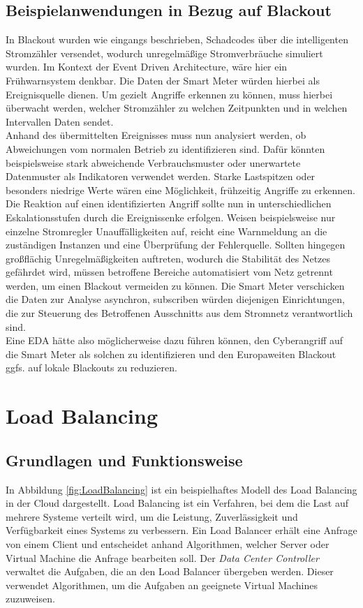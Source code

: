 \documentclass[a4paper,12pt]{article}
\let\stdsection\section
\renewcommand\section{\newpage\stdsection}
\begin{document}
\subsection{Beispielanwendungen in Bezug auf Blackout}
In Blackout wurden wie eingangs beschrieben, Schadcodes über die intelligenten Stromzähler versendet, wodurch unregelmäßige Stromverbräuche simuliert wurden. Im Kontext der Event Driven Architecture, wäre hier ein Frühwarnsystem denkbar. Die Daten der Smart Meter würden hierbei als Ereignisquelle dienen. Um gezielt Angriffe erkennen zu können, muss hierbei überwacht werden, welcher Stromzähler zu welchen Zeitpunkten und in welchen Intervallen Daten sendet.\\
Anhand des übermittelten Ereignisses muss nun analysiert werden, ob Abweichungen vom normalen Betrieb zu identifizieren sind. Dafür könnten beispielsweise stark abweichende Verbrauchsmuster oder unerwartete Datenmuster als Indikatoren verwendet werden. Starke Lastspitzen oder besonders niedrige Werte wären eine Möglichkeit, frühzeitig Angriffe zu erkennen.\\
Die Reaktion auf einen identifizierten Angriff sollte nun in unterschiedlichen Eskalationsstufen durch die Ereignissenke erfolgen. Weisen beispielsweise nur einzelne Stromregler Unauffälligkeiten auf, reicht eine Warnmeldung an die zuständigen Instanzen und eine Überprüfung der Fehlerquelle. Sollten hingegen großflächig Unregelmäßigkeiten auftreten, wodurch die Stabilität des Netzes gefährdet wird, müssen betroffene Bereiche automatisiert vom Netz getrennt werden, um einen Blackout vermeiden zu können. Die Smart Meter verschicken die Daten zur Analyse asynchron, subscriben würden diejenigen Einrichtungen, die zur Steuerung des Betroffenen Ausschnitts aus dem Stromnetz verantwortlich sind.\\
Eine EDA hätte also möglicherweise dazu führen können, den Cyberangriff auf die Smart Meter als solchen zu identifizieren und den Europaweiten Blackout ggfs. auf lokale Blackouts zu reduzieren.


\section{Load Balancing}
\subsection{Grundlagen und Funktionsweise}
In Abbildung \ref{fig:LoadBalancing} ist ein beispielhaftes Modell des Load Balancing in der Cloud dargestellt. Load Balancing ist ein Verfahren, bei dem die Last auf mehrere Systeme verteilt wird, um die Leistung, Zuverlässigkeit und Verfügbarkeit eines Systems zu verbessern.
Ein Load Balancer erhält eine Anfrage von einem Client und entscheidet anhand Algorithmen, welcher Server oder Virtual Machine die Anfrage bearbeiten soll. 
Der \textit{Data Center Controller} verwaltet die Aufgaben, die an den Load Balancer übergeben werden. Dieser verwendet Algorithmen, um die Aufgaben an geeignete Virtual Machines zuzuweisen.
\end{document}
